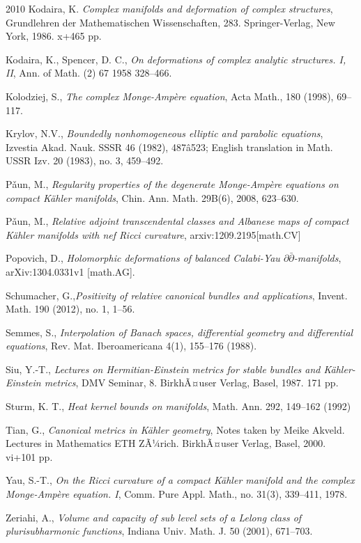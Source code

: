 \documentclass{amsart}
\theoremstyle{definition}
\numberwithin{equation}{section}
\begin{document}
\begin{thebibliography} {2010}
  Kodaira, K. \emph{Complex manifolds and deformation of complex structures}, Grundlehren der Mathematischen Wissenschaften, 283. Springer-Verlag, New York, 1986. x+465 pp.

 Kodaira, K., Spencer, D. C., 
\emph{On deformations of complex analytic structures. I, II},
Ann. of Math. (2) 67 1958 328--466. 

 Kolodziej, S., \emph{The complex Monge-Amp\`ere equation}, Acta Math., 180 (1998), 69--117.

 Krylov, N.V., 
\emph{Boundedly nonhomogeneous elliptic and parabolic equations}, 
Izvestia Akad. Nauk. SSSR 46 (1982), 487â523; English translation in Math. USSR Izv. 20
(1983), no. 3, 459--492.

 P\v{a}un, M., 
\emph{Regularity properties of the degenerate Monge-Amp\`ere equations on compact K\"ahler manifolds}, 
Chin. Ann. Math. 29B(6), 2008, 623--630.

 P\v{a}un, M., 
\emph{Relative adjoint transcendental classes and Albanese maps of compact K\"ahler manifolds with nef Ricci curvature}, 
arxiv:1209.2195[math.CV]

 Popovich, D., \emph{Holomorphic deformations of balanced Calabi-Yau $\partial\bar\partial$-manifolds}, arXiv:1304.0331v1 [math.AG]. 

 Schumacher, G.,\emph{Positivity of relative canonical bundles and applications}, Invent. Math. 190 (2012), no. 1, 1--56.

 Semmes, S., \emph{Interpolation of Banach spaces, differential geometry and differential equations}, Rev. Mat. Iberoamericana 4(1), 155--176 (1988).

 Siu, Y.-T.,
\emph{Lectures on Hermitian-Einstein metrics for stable bundles and K\"ahler-Einstein metrics}, 
DMV Seminar, 8. BirkhÃ¤user Verlag, Basel, 1987. 171 pp.

 Sturm, K. T., 
\emph{Heat kernel bounds on manifolds}, 
Math. Ann. 292, 149--162 (1992)

 Tian, G., 
\emph{Canonical metrics in K\"ahler geometry}, 
Notes taken by Meike Akveld. Lectures in Mathematics ETH ZÃ¼rich. BirkhÃ¤user Verlag, Basel, 2000. vi+101 pp.

 Yau, S.-T.,
\emph{On the Ricci curvature of a compact K\"ahler manifold and the complex Monge-Amp\`ere equation. I}, 
Comm. Pure Appl. Math., no. 31(3), 339--411, 1978.

 Zeriahi, A., \emph{Volume and capacity of sub level sets of a Lelong class of plurisubharmonic functions}, Indiana Univ. Math. J. 50 (2001), 671--703.

\end{thebibliography}
\end{document}
